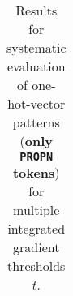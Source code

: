 \begin{table}[t]
\begin{tabular}{lllllll}

\hline
\end{tabular}
\caption[Model Evaluation for only \texttt{PROPN} tokens]{Results for systematic evaluation of one-hot-vector patterns (\textbf{only \texttt{PROPN} tokens}) for multiple integrated gradient thresholds $t$.}
\label{tab:evalResultsPROPN}
\end{table}
	